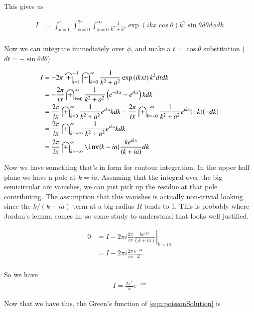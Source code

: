 \documentclass{article}
\begin{document}
This gives us

\begin{align*}
I &= \int_{\theta=0}^{\pi} \int_{\phi=0}^{2\pi} \int_{k=0}^\infty \frac{1}{k^2 + a^2} \exp\left( i k x \cos\theta \right)
k^2 \sin\theta d\theta d\phi dk \\
\end{align*}

Now we can integrate immediately over $\phi$, and make a $t = \cos\theta$ substitution ($dt = -\sin\theta d\theta$)

\begin{align*}
I
&= - 2\pi \int_{t=1}^{-1} \int_{k=0}^\infty \frac{1}{k^2 + a^2} \exp\left( i k x t \right) k^2 dt dk \\
&= - \frac{2\pi}{ix} \int_{k=0}^\infty \frac{1}{k^2 + a^2}
\left(
e^{-i k x } -e^{i k x }
\right)
k dk \\
&= \frac{2\pi}{ix} \int_{k=0}^\infty \frac{1}{k^2 + a^2}
e^{i k x }
k dk
- \frac{2\pi}{ix} \int_{k=-0}^{-\infty} \frac{1}{k^2 + a^2}
e^{i k x }
(-k) (-dk) \\
&= \frac{2\pi}{ix} \int_{k=-\infty}^\infty \frac{1}{k^2 + a^2} e^{i k x } k dk \\
&= \frac{2\pi}{ix} \int_{k=-\infty}^\infty \inv{k - ia} \frac{ k e^{ i k x } }{(k + ia)} dk \\
\end{align*}

Now we have something that's in form for contour integration.  In the upper half plane we have a pole at $k= ia$.  Assuming that the
integral over the big semicircular arc vanishes, we can just pick up the residue at that pole contributing.  The assumption that
this vanishes is actually non-trivial looking since the $k/(k+ia)$ term at a big radius $R$ tends to $1$.  This is probably where
Jordan's lemma comes in, so some study to understand that looks well justified.

\begin{align*}
0
&= I - 2 \pi i {\left. \frac{2\pi}{ix} \frac{ k e^{ i k x } }{(k + ia)} \right\vert}_{k= ia} \\
&= I - 2 \pi i \frac{2\pi}{ix} \frac{ e^{ - a x } }{2} \\
\end{align*}

So we have
\begin{align*}
I = \frac{2 \pi^2}{x} e^{ - a x }
\end{align*}

Now that we have this, the Green's function of \ref{eqn:poissonSolution} is
\end{document}
